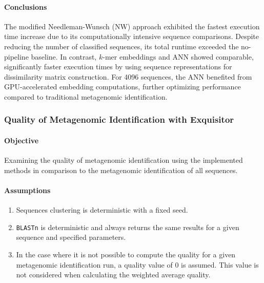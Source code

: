 \documentclass[biomedinformatics,article,submit,moreauthors]{Definitions/mdpi}
\begin{document}
                \paragraph{Conclusions}
                The modified Needleman-Wunsch (NW) approach exhibited the fastest execution time increase due to its computationally intensive sequence comparisons. Despite reducing the number of classified sequences, its total runtime exceeded the no-pipeline baseline. In contrast, $k$-mer embeddings and ANN showed comparable, significantly faster execution times by using sequence representations for dissimilarity matrix construction. For 4096 sequences, the ANN benefited from GPU-accelerated embedding computations, further optimizing performance compared to traditional metagenomic identification.

            \subsubsection{Quality of Metagenomic Identification with Exquisitor}
                \paragraph{Objective}
                Examining the quality of metagenomic identification using the implemented methods in comparison to the metagenomic identification of all sequences.

                \paragraph{Assumptions}
                \begin{enumerate}
                    \item {
                        Sequences clustering is deterministic with a fixed seed.
                    }
                    \item {
                        \texttt{BLASTn} is deterministic and always returns the same results for a given sequence and specified parameters.
                    }
                    \item {
                        In the case where it is not possible to compute the quality for a given metagenomic identification run, a quality value of $0$ is assumed. This value is not considered when calculating the weighted average quality.
                    }
                  \end{enumerate}
\end{document}
